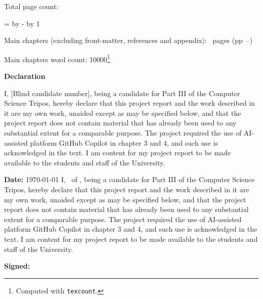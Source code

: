 \begin{sffamily}
\begin{titlepage}
        \makeatother
    \end{titlepage}

    \newpage

    Total page count: \pageref{lastpage}

    \makeatletter
    \@tempcnta=\relax%
    \advance\@tempcnta by -%
    \advance\@tempcnta by 1%
    \xdef\contentpages{\the\@tempcnta}%
    \makeatother

    Main chapters (excluding front-matter, references and appendix):
    \contentpages~pages
    (pp~\pageref{firstcontentpage}--\pageref{lastcontentpage})

    Main chapters word count: 10000\footnote{Computed with \texttt{texcount}.}

\end{sffamily}

\vspace{\fill}
\onehalfspacing
\makeatletter
\textbf{\Huge Declaration}
\vspace{40pt}

\ifsubmission
    I, [Blind candidate number], being a candidate for Part III of the Computer Science Tripos, hereby declare that this project report and the work described in it are my own work, unaided except as may be specified below, and that the project report does not contain material that has already been used to any substantial extent for a comparable purpose. The project required the use of AI-assisted platform GitHub Copilot in chapter 3 and 4, and such use is acknowledged in the text. I am content for my project report to be made available to the students and staff of the University.

    \bigskip
    \textbf{Date:} \today
\else
    I, \@author\ of \college, being a candidate for Part III of the Computer Science Tripos, hereby declare that this project report and the work described in it are my own work, unaided except as may be specified below, and that the project report does not contain material that has already been used to any substantial extent for a comparable purpose. The project required the use of AI-assisted platform GitHub Copilot in chapter 3 and 4, and such use is acknowledged in the text. I am content for my project report to be made available to the students and staff of the University.

    \bigskip
    \textbf{Signed:} \@author

